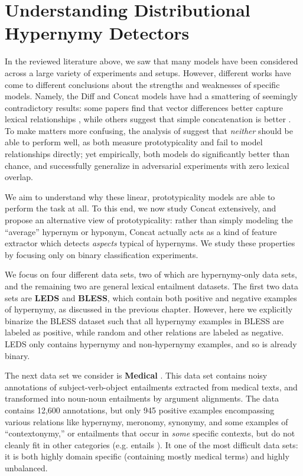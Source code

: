 \section{Understanding Distributional Hypernymy Detectors}

In the reviewed literature above, we saw that many models have been considered
across a large variety of experiments and setups. However, different works have
come to different conclusions about the strengths and weaknesses of specific
models. Namely, the Diff and Concat models have had a smattering of seemingly
contradictory results: some papers find that vector differences better capture
lexical relationships \cite{fu:2014:acl,roller:2014:coling,vylomova:2016:acl},
while others suggest that simple concatenation is better
\cite{baroni:2012:eacl,weeds:2014:coling,shwartz:2016:acl}. To make matters
more confusing, the analysis of  suggest that
{\em neither} should be able to perform well, as both measure prototypicality
and fail to model relationships directly; yet empirically, both models do
significantly better than chance, and successfully generalize in adversarial
experiments with zero lexical overlap.

We aim to understand why these linear, prototypicality models are able to
perform the task at all. To this end, we now study Concat extensively, and
propose an alternative view of prototypicality: rather than simply modeling the
``average'' hypernym or hyponym, Concat actually acts as a kind of feature
extractor which detects {\em aspects} typical of hypernyms.  We study these
properties by focusing only on binary classification experiments.

We focus on four different data sets, two of which are hypernymy-only data
sets, and the remaining two are general lexical entailment datasets. The first
two data sets are {\bf LEDS} and {\bf BLESS}, which contain both positive and
negative examples of hypernymy, as discussed in the previous chapter. However,
here we explicitly binarize the BLESS dataset such that all hypernymy examples
in BLESS are labeled as positive, while random and other relations are labeled
as negative. LEDS only contains hypernymy and non-hypernymy examples, and so is
already binary.

The next data set we consider is {\bf Medical} \cite{levy:2014:conll}. This
data set contains noisy annotations of subject-verb-object entailments
extracted from medical texts, and transformed into noun-noun entailments by
argument alignments. The data contains 12,600 annotations, but only 945
positive examples encompassing various relations like hypernymy, meronomy,
synonymy, and some examples of ``contextonymy,'' or entailments that occur in
{\em some} specific contexts, but do not cleanly fit in other categories (e.g.
 entails ). It one of the most difficult data sets:
it is both highly domain specific (containing mostly medical terms) and highly
unbalanced.

